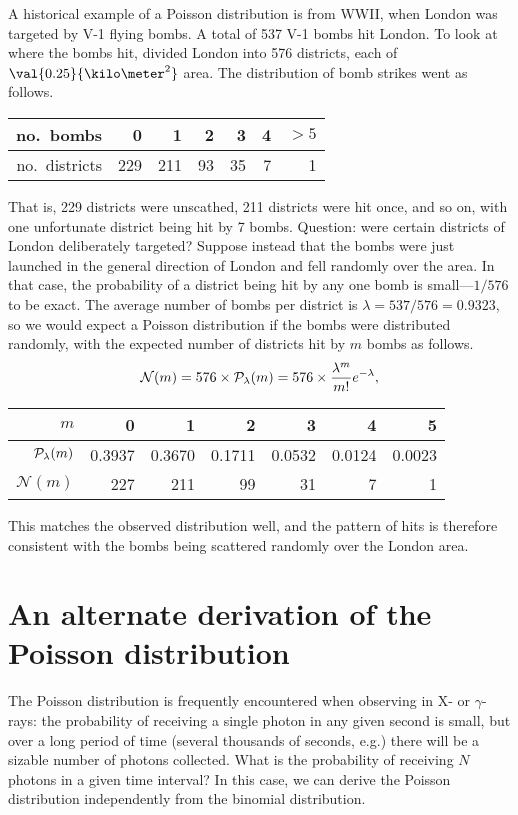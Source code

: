 A historical example of a Poisson distribution is from WWII, when London was targeted by V-1 flying bombs.  A total of 537 V-1 bombs hit London.  To look at where the bombs hit,  divided London into 576 districts, each of $\val{0.25}{\kilo\meter^{2}}$ area.  The distribution of bomb strikes went as follows.
\begin{center}
\begin{tabular}{r|rrrrrr}
no.\ bombs & 0 & 1 & 2 & 3 & 4 & $>5$\\
\hline
no.\ districts & 229 & 211 & 93 & 35 & 7 & 1\\
\end{tabular}
\end{center}
That is, 229 districts were unscathed, 211 districts were hit once, and so on, with one unfortunate district being hit by 7 bombs.  Question: were certain districts of London deliberately targeted? Suppose instead that the bombs were just launched in the general direction of London and fell randomly over the area.  In that case, the probability of a district being hit by any one bomb is small---$1/576$ to be exact.  The average number of bombs per district is $\lambda = 537/576 = 0.9323$, so we would expect a Poisson distribution if the bombs were distributed randomly, with the expected number of districts hit by $m$ bombs as follows.
\[ \mathcal{N}(m) = 576\times \mathcal{P}_{\lambda}(m) = 576\times \frac{\lambda^{m}}{m!}e^{-\lambda}, \]
\begin{center}
\begin{tabular}{r|rrrrrr}
$m$ & 0 & 1 & 2 & 3 & 4 & 5\\
\hline
$\mathcal{P}_{\lambda}(m)$ & 0.3937 & 0.3670 & 0.1711 & 0.0532 & 0.0124 & 0.0023\\
$\mathcal{N}(m)$ & 227 & 211 & 99 & 31 & 7 & 1
\end{tabular}
\end{center}
This matches the observed distribution well, and the pattern of hits is therefore consistent with the bombs being scattered randomly over the London area.

\section{An alternate derivation of the Poisson distribution}
The Poisson distribution is frequently encountered when observing in X- or $\gamma$-rays: the probability of receiving a single photon in any given second is small, but over a long period of time (several thousands of seconds, e.g.) there will be a sizable number of photons collected.  What is the probability of receiving $N$ photons in a given time interval? In this case, we can derive the Poisson distribution independently from the binomial distribution.

